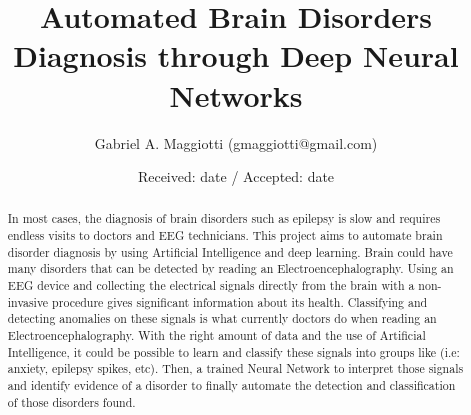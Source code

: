 \documentclass{llncs}       %
\begin{document}
\title{Automated Brain Disorders Diagnosis through Deep Neural Networks%
}


\author{Gabriel A. Maggiotti (gmaggiotti@gmail.com)
}



\date{Received: date / Accepted: date}


\maketitle


\begin{abstract}
In most cases, the diagnosis of brain disorders such as epilepsy is slow and requires endless visits to doctors and EEG technicians.  This project aims to automate brain disorder diagnosis by using  Artificial Intelligence and deep learning.  Brain could have many disorders that can be detected by reading an Electroencephalography.  Using an EEG device and collecting the electrical signals directly from the brain with a non-invasive procedure gives significant information about  its health.  Classifying and detecting anomalies on these signals is what currently doctors do when reading an Electroencephalography.  With the right amount of data and the use of Artificial Intelligence, it could be possible to learn and classify these signals into groups like (i.e: anxiety, epilepsy spikes, etc).  Then, a trained Neural Network to interpret those signals and identify evidence of a disorder to finally automate the detection and classification of those disorders found.
\end{abstract}


\paragraph{}\paragraph{}
\end{document}

